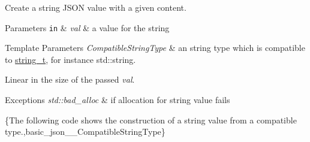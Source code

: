 Create a string J\-S\-O\-N value with a given content.


\begin{DoxyParams}[1]{Parameters}
\mbox{\tt in}  & {\em val} & a value for the string\\
\hline
\end{DoxyParams}

\begin{DoxyTemplParams}{Template Parameters}
{\em Compatible\-String\-Type} & an string type which is compatible to \hyperlink{classnlohmann_1_1basic__json_ab63e618bbb0371042b1bec17f5891f42}{string\-\_\-t}, for instance {\ttfamily std\-::string}.\\
\hline
\end{DoxyTemplParams}
Linear in the size of the passed {\itshape val}.


\begin{DoxyExceptions}{Exceptions}
{\em std\-::bad\-\_\-alloc} & if allocation for string value fails\\
\hline
\end{DoxyExceptions}
\{The following code shows the construction of a string value from a compatible type.,basic\-\_\-json\-\_\-\-\_\-\-Compatible\-String\-Type\}

